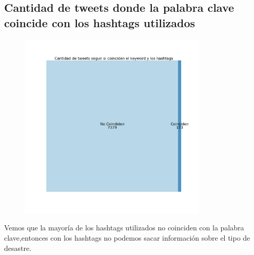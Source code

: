 \documentclass[titlepage,a4paper]{article}
\begin{document}
\subsection{\Large Cantidad de tweets donde la palabra clave coincide con los hashtags utilizados}
{\Large
\begin{figure}[H]
 \centering
 \includegraphics[width=0.8\textwidth, height=0.8\textheight, keepaspectratio]{graficos/Cantidad_tweets_keyword_hashtags_0.png}
\end{figure}
\begin{figure}[H] 
    \centering
    \hfill%
\end{figure}
Vemos que la mayoría de los hashtags utilizados no coinciden con la palabra clave,entonces con los hashtags no podemos sacar información sobre el tipo de desastre.
\par}
\end{document}
